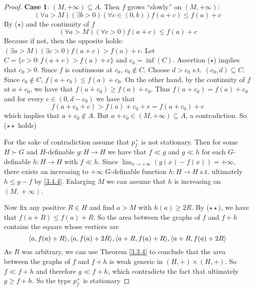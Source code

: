 \documentclass[11pt]{article}
\begin{document}
\begin{proof}
\textbf{Case 1}: \((M,+\infty)\subseteq A\). Then \(f\) grows ``slowly'' on \((M,+\infty)\):
\begin{equation*}
(\forall a>M)(\exists b>0)(\forall c\in(0,b))f(a+c)\le f(a)+c\tag{\star}
\end{equation*}
By (\(\star\)) and the continuity of \(f\)
\begin{equation*}
(\forall a>M)(\forall c>0)f(a+c)\le f(a)+c\tag{\star\star}
\end{equation*}
Because if not, then the opposite holds: \((\exists a>M)(\exists c>0)f(a+c)>f(a)+c\).
Let \(C=\{c>0:f(a+c)>f(a)+c\}\) and \(c_0=\inf(C)\).
Assertion (\(\star\)) implies that \(c_0>0\). Since \(f\) is continuous at \(c_0\), \(c_0\notin C\).
Choose \(d>c_0\) s.t. \((c_0,d)\subseteq C\). Since \(c_0\notin C\), \(f(a+c_0)\le f(a)+c_0\). On the other
hand, by the continuity of \(f\) at \(a+c_0\), we have that \(f(a+c_0)\ge f(a)+c_0\).
Thus \(f(a+c_0)=f(a)+c_0\) and for every \(e\in(0,d-c_0)\) we have that
\begin{equation*}
f(a+c_0+e)>f(a)+c_0+e=f(a+c_0)+e
\end{equation*}
which implies that \(a+c_0\notin A\). But \(a+c_0\in(M,+\infty)\subseteq A\), a contradiction. So (\(\star\star\) holds)

For the sake of contradiction assume that \(p_f^+\) is not stationary. Then for some \(H\succ G\) and
\(H\)-definable \(g:H\to H\) we have that \(f\ll g\) and \(g\ll h\) for each \(G\)-definable \(h:H\to H\)
with \(f\ll h\).
Since \(\lim_{x\to+\infty}(g(x)-f(x))=+\infty\), there exists an increasing
to \(+\infty\) \(G\)-definable function \(h:H\to H\) s.t. ultimately \(h\le g-f\) by \ref{3.4.4}.
Enlarging \(M\) we can assume that \(h\) is increasing on \((M,​+\infty)\).

Now fix any positive \(R\in H\) and find \(a>M\) with \(h(a)\ge 2R\). By (\(\star\star\)), we have
that \(f(a+R)\le f(a)+R\). So the area between the graphs of \(f\) and \(f+h\) contains the square
whose vertices are
\begin{equation*}
\langle a,f(a)+R\rangle,\langle a,f(a)+2R\rangle,\langle a+R,f(a)+R\rangle,\langle a+R,f(a)+2R\rangle
\end{equation*}
As \(R\) was arbitrary, we can use Theorem \ref{3.3.4} to conclude that the area between the
graphs of \(f\) and \(f+h\) is weak generic in \((H,+)\times(H,+)\). So \(f\ll f+h\) and
therefore \(g\ll f+h\), which contradicts the fact that ultimately \(g\ge f+h\). So the
type \(p_f^+\) is stationary


\end{proof}
\end{document}
